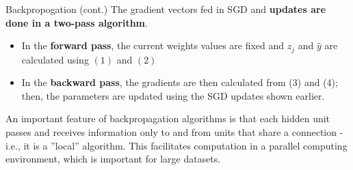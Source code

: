 \documentclass{beamer}
\begin{document}
\begin{frame}{Backpropogation (cont.)}
The gradient vectors fed in SGD and \textbf{updates are done in a two-pass algorithm}.
\begin{itemize}
\item In the \textbf{forward pass}, the current weights values are fixed and $z_{j}$ and $\hat{y}$ are calculated using $(1)$ and $(2)$
\item In the \textbf{backward pass}, the gradients are then calculated from (3) and (4); then, the parameters are updated using the SGD updates shown earlier.
\end{itemize}
An important feature of backpropagation algorithms is that each hidden unit passes and receives information only to and from units that share a connection - i.e., it is a ''local'' algorithm. This facilitates computation in a parallel computing environment, which is important for large datasets.
\end{frame}
\end{document}
